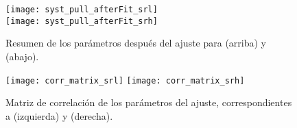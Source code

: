 \begin{figure}[!htb]
  \centering

  \texttt{[image: syst\_pull\_afterFit\_srl]} \\
  \texttt{[image: syst\_pull\_afterFit\_srh]}

  \caption{Resumen de los parámetros después del ajuste para {\SRL} (arriba) y {\SRH} (abajo).}
  \label{fig:fit_unc_nuisance}

\end{figure}


\begin{figure}[!htb]
  \centering

  \texttt{[image: corr\_matrix\_srl]}
  \texttt{[image: corr\_matrix\_srh]}

  \caption{Matriz de correlación de los parámetros del ajuste, correspondientes a {\SRL} (izquierda) y {\SRH} (derecha).}
  \label{fig:fit_corrmatrix}

\end{figure}











